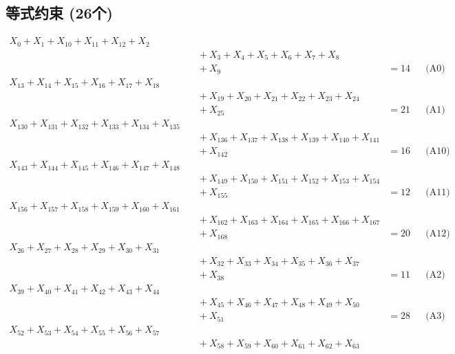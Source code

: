 \documentclass[a4paper,10pt]{article}
\begin{document}
\subsection{等式约束 (26个)}

\allowdisplaybreaks
{\small\begin{align}
X_{0} + X_{1} + X_{10} + X_{11} + X_{12} + X_{2} \\[0.5ex]
&\quad  + X_{3} + X_{4} + X_{5} + X_{6} + X_{7} + X_{8} \\[0.5ex]
&\quad  + X_{9} &= 14 && \text{(A0)} \\
X_{13} + X_{14} + X_{15} + X_{16} + X_{17} + X_{18} \\[0.5ex]
&\quad  + X_{19} + X_{20} + X_{21} + X_{22} + X_{23} + X_{24} \\[0.5ex]
&\quad  + X_{25} &= 21 && \text{(A1)} \\
X_{130} + X_{131} + X_{132} + X_{133} + X_{134} + X_{135} \\[0.5ex]
&\quad  + X_{136} + X_{137} + X_{138} + X_{139} + X_{140} + X_{141} \\[0.5ex]
&\quad  + X_{142} &= 16 && \text{(A10)} \\
X_{143} + X_{144} + X_{145} + X_{146} + X_{147} + X_{148} \\[0.5ex]
&\quad  + X_{149} + X_{150} + X_{151} + X_{152} + X_{153} + X_{154} \\[0.5ex]
&\quad  + X_{155} &= 12 && \text{(A11)} \\
X_{156} + X_{157} + X_{158} + X_{159} + X_{160} + X_{161} \\[0.5ex]
&\quad  + X_{162} + X_{163} + X_{164} + X_{165} + X_{166} + X_{167} \\[0.5ex]
&\quad  + X_{168} &= 20 && \text{(A12)} \\
X_{26} + X_{27} + X_{28} + X_{29} + X_{30} + X_{31} \\[0.5ex]
&\quad  + X_{32} + X_{33} + X_{34} + X_{35} + X_{36} + X_{37} \\[0.5ex]
&\quad  + X_{38} &= 11 && \text{(A2)} \\
X_{39} + X_{40} + X_{41} + X_{42} + X_{43} + X_{44} \\[0.5ex]
&\quad  + X_{45} + X_{46} + X_{47} + X_{48} + X_{49} + X_{50} \\[0.5ex]
&\quad  + X_{51} &= 28 && \text{(A3)} \\
X_{52} + X_{53} + X_{54} + X_{55} + X_{56} + X_{57} \\[0.5ex]
&\quad  + X_{58} + X_{59} + X_{60} + X_{61} + X_{62} + X_{63} \\[0.5ex]

\end{align}}
\end{document}
